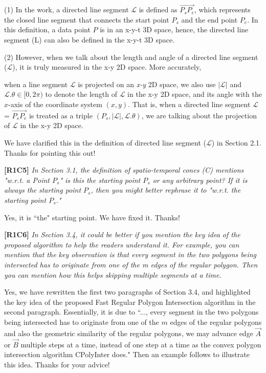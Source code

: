 \documentclass{letter}
\newcommand{\vv}{\overrightarrow}
\begin{document}
(1) In the work, a directed line segment $\mathcal{L}$ is defined as $\vv{P_{s}P_{e}}$, which represents the closed line segment that connects the start point $P_s$ and the end point $P_e$. In this definition, a data point $P$ is in an x-y-t 3D space, hence, the directed line segment (L) can also be defined in the x-y-t 3D space.

(2) However, when we talk about the length and angle of a directed line segment ($\mathcal{L}$), it is truly measured in the x-y 2D space. More accurately, {when a line segment $\mathcal{L}$ is projected on an \emph{x-y} 2D space, we also use $|\mathcal{L}|$ and $\mathcal{L}.\theta\in [0, 2\pi)$ to denote the length of $\mathcal{L}$ in the x-y 2D space, and its angle with the $x$-axis of the coordinate system $(x, y)$.  That is, when a directed line segment $\mathcal{L}$ = $\vv{P_{s}P_{e}}$ is treated as a triple $(P_s, |\mathcal{L}|, \mathcal{L}.\theta)$, we are talking about the projection of $\mathcal{L}$ in the x-y 2D space.

We have clarified this in the definition of directed line segment ($\mathcal{L}$) in Section 2.1. Thanks for pointing this out!


\textbf{[R1C5]} \emph{In Section 3.1, the definition of spatio-temporal cones (C) mentions "w.r.t. a Point $P_s$" is this the starting point $P_s$ or any arbitrary point? If it is always the starting point $P_s$, then you might better rephrase it to "w.r.t. the starting point $P_s$."}

Yes, it is ``the" starting point. We have fixed it. Thanks!

\textbf{[R1C6]} \emph{In Section 3.4, it could be better if you mention the key idea of the proposed algorithm to help the readers understand it. For example, you can mention that the key observation is that every segment in the two polygons being intersected has to originate from one of the m edges of the regular polygon. Then you can mention how this helps skipping multiple segments at a time.}

Yes, we have rewritten the first two paragraphs of Section 3.4, and highlighted the key idea of the proposed Fast Regular Polygon Intersection algorithm in the second paragraph. {Essentially, it is due to ``..., every segment in the two polygons being intersected has to originate from one of the $m$ edges of the regular polygons and also the geometric similarity of the regular polygons,
we may advance edge $\vv{A}$ or $\vv{B}$ multiple steps at a time, instead of one step at a time as the convex polygon intersection algorithm CPolyInter does."} Then an example follows to illustrate this idea.  Thanks for your advice!



}
\end{document}

